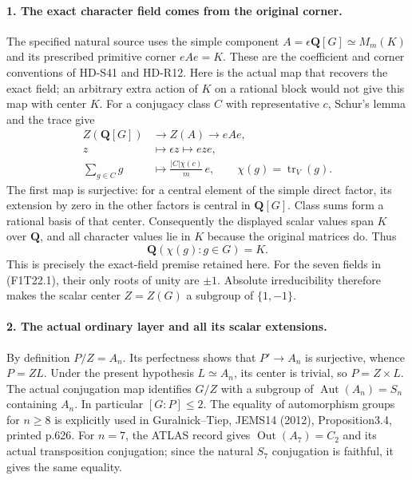 \paragraph{1. The exact character field comes from the original corner.}
The specified natural source uses the simple component
\(A=\epsilon\mathbf Q[G]\simeq M_m(K)\) and its
prescribed primitive corner \(eAe=K\). These are the
coefficient and corner conventions of HD-S41 and HD-R12.
Here is the actual map that recovers the exact field;
an arbitrary extra action of \(K\) on a rational block
would not give this map with center \(K\).
For a conjugacy class \(C\) with representative \(c\),
Schur's lemma and the trace give
\[
 \begin{split}
 Z(\mathbf Q[G])&\longrightarrow Z(A)
                \longrightarrow eAe,\\
 z&\longmapsto\epsilon z\longmapsto eze,\\
 \sum_{g\in C}g&\longmapsto
        \frac{|C|\chi(c)}m\,e,
 \qquad \chi(g)=\operatorname{tr}_V(g).
 \end{split}
 \tag{F1T22.3}
\]
The first map is surjective: for a central element of the
simple direct factor, its extension by zero in the other
factors is central in \(\mathbf Q[G]\). Class sums
form a rational basis of that center. Consequently the
displayed scalar values span \(K\) over \(\mathbf Q\),
and all character values lie in \(K\) because the
original matrices do. Thus
\[
                 \mathbf Q(\chi(g):g\in G)=K.
 \tag{F1T22.4}
\]
This is precisely the exact-field premise retained here.
For the seven fields in (F1T22.1), their only roots of
unity are \(\pm1\). Absolute irreducibility therefore
makes the scalar center \(Z=Z(G)\) a subgroup of
\(\{1,-1\}\).

\paragraph{2. The actual ordinary layer and all its scalar extensions.}
By definition \(P/Z=A_n\). Its perfectness shows that
\(P'\to A_n\) is surjective, whence \(P=ZL\).
Under the present hypothesis \(L\simeq A_n\), its
center is trivial, so \(P=Z\times L\).
The actual conjugation map identifies \(G/Z\) with a
subgroup of \(\operatorname{Aut}(A_n)=S_n\) containing
\(A_n\). In particular \([G:P]\le2\). The equality
of automorphism groups for \(n\ge8\) is explicitly
used in Guralnick--Tiep, JEMS14 (2012), Proposition3.4,
printed p.626. For \(n=7\), the ATLAS record gives
\(\operatorname{Out}(A_7)=C_2\) and its actual
transposition conjugation; since the natural \(S_7\)
conjugation is faithful, it gives the same equality.

